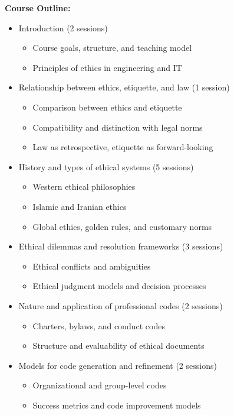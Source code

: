 \documentclass[12pt]{article}
\begin{document}
\textbf{Course Outline:}
\begin{itemize}
    \item Introduction (2 sessions)
    \begin{itemize}
        \item Course goals, structure, and teaching model
        \item Principles of ethics in engineering and IT
    \end{itemize}

    \item Relationship between ethics, etiquette, and law (1 session)
    \begin{itemize}
        \item Comparison between ethics and etiquette
        \item Compatibility and distinction with legal norms
        \item Law as retrospective, etiquette as forward-looking
    \end{itemize}

    \item History and types of ethical systems (5 sessions)
    \begin{itemize}
        \item Western ethical philosophies
        \item Islamic and Iranian ethics
        \item Global ethics, golden rules, and customary norms
    \end{itemize}

    \item Ethical dilemmas and resolution frameworks (3 sessions)
    \begin{itemize}
        \item Ethical conflicts and ambiguities
        \item Ethical judgment models and decision processes
    \end{itemize}

    \item Nature and application of professional codes (2 sessions)
    \begin{itemize}
        \item Charters, bylaws, and conduct codes
        \item Structure and evaluability of ethical documents
    \end{itemize}

    \item Models for code generation and refinement (2 sessions)
    \begin{itemize}
        \item Organizational and group-level codes
        \item Success metrics and code improvement models
    \end{itemize}


\end{itemize}
\end{document}
